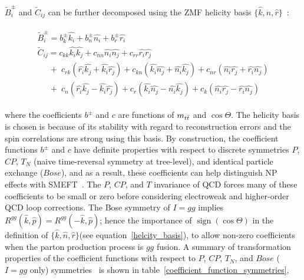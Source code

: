 $\tilde{B}_i^\pm$ and $ \tilde{C}_{ij} $ can be further decomposed using the \ttbar ZMF helicity basis $\{\hat{k},\hat{n},\hat{r}\}$~\cite{Bernreuther}:
\begin{linenomath*}
\begin{align}
\begin{array}{l}
\tilde{B}_i^\pm =  b_k^\pm \hat{k_i} + b_n^\pm \hat{n_i} + b_r^\pm \hat{r_i} \\
\tilde{C}_{ij}  =  c_{kk} \hat{k_i}\hat{k_j} + c_{nn} \hat{n_i}\hat{n_j} + c_{rr} \hat{r_i}\hat{r_j} \\ 
\;\;\;\;\; + \; c_{rk} (\hat{r_i}\hat{k_j} + \hat{k_i}\hat{r_j}) +  c_{kn} (\hat{k_i}\hat{n_j} + \hat{n_i}\hat{k_j})  +  c_{nr} (\hat{n_i}\hat{r_j} + \hat{r_i}\hat{n_j}) \\
\;\;\;\;\; + \; c_{n} (\hat{r_i}\hat{k_j} - \hat{k_i}\hat{r_j}) +  c_{r} (\hat{k_i}\hat{n_j} - \hat{n_i}\hat{k_j})  +  c_{k} (\hat{n_i}\hat{r_j} - \hat{r_i}\hat{n_j})
\end{array}
\label{spin_density_matrix_decomposition_expansion}
\end{align}
\end{linenomath*}
where the coefficients $b^\pm$ and $c$ are functions of $m_{t\bar{t}}$ and $\cos \Theta$.
The helicity basis is chosen is because of its stability with regard to reconstruction errors and the spin correlations are strong using this basis.
By construction, the coefficient functions $b^\pm$ and $c$ have definite properties with respect to discrete symmetries $P$, $CP$, $T_N$ (naive time-reversal symmetry at tree-level), and identical particle exchange ($Bose$), and as a result, these coefficients can help distinguish NP effects with SMEFT~\cite{Bernreuther}.
The $P$, $CP$, and $T$ invariance of QCD forces many of these coefficients to be small or zero before considering electroweak and higher-order QCD loop corrections.
The Bose symmetry of $I = gg$ implies $R^{gg}(\hat{k},\hat{p}) = R^{gg}(-\hat{k},\hat{p})$; hence the importance of $\operatorname{sign}(\cos \Theta)$ in the definition of $\{\hat{k},\hat{n},\hat{r}\}$(see equation~\ref{helcity_basis}), to allow non-zero coefficients when the parton production process is $gg$ fusion.
A summary of transformation properties of the coefficient functions with respect to $P$, $CP$, $T_N$, and $Bose$ ($I = gg$ only) symmetries~\cite{Bernreuther} is shown in table~\ref{coefficient_function_symmetries}, 
